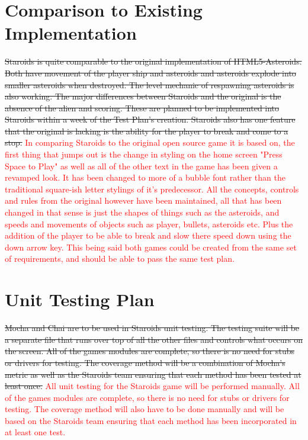 \documentclass[12pt, titlepage]{article}
\begin{document}
\section{Comparison to Existing Implementation}
\sout{Staroids is quite comparable to the original implementation of HTML5-Asteroids. Both have movement of the player ship and asteroids and asteroids explode into smaller asteroids when destroyed. The level mechanic of respawning asteroids is also working. The major differences between Staroids and the original is the absence of the alien and scoring. These are planned to be implemented into Staroids within a week of the Test Plan's creation. Staroids also has one feature that the original is lacking is the ability for the player to break and come to a stop.}
\textcolor{red}{In comparing Staroids to the original open source game it is based on, the first thing that jumps out is the change in styling on the home screen "Press Space to Play" as well as all of the other text in the game has been given a revamped look. It has been changed to more of a bubble font rather than the traditional square-ish letter stylings of it's predecessor. All the concepts, controls and rules from the original however have been maintained, all that has been changed in that sense is just the shapes of things such as the asteroids, and speeds and movements of objects such as player, bullets, asteroids etc. Plus the addition of the player to be able to break and slow there speed down using the down arrow key. This being said both games could be created from the same set of requirements, and should be able to pass the same test plan.}

\section{Unit Testing Plan}
\sout{Mocha and Chai are to be used in Staroids unit testing. The testing suite will be a separate file that runs over top of all the other files and controls what occurs on the screen. All of the games modules are complete, so there is no need for stubs or drivers for testing. The coverage method will be a combination of  Mocha's metric as well as the Staroids team ensuring that each method has been tested at least once.}
\textcolor{red}{All unit testing for the Staroids game will be performed manually. All of the games modules are complete, so there is no need for stubs or drivers for testing. The coverage method will also have to be done manually and will be based on the Staroids team ensuring that each method has been incorporated in at least one test. }
\end{document}
